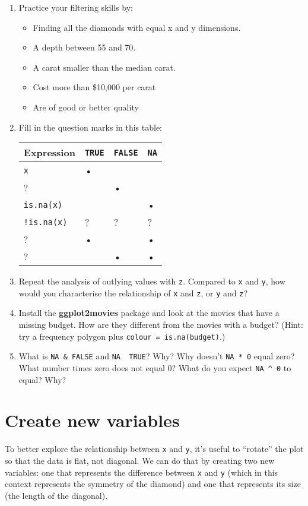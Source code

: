 \begin{enumerate}
\def\labelenumi{\arabic{enumi}.}
\item
  Practice your filtering skills by:

  \begin{itemize}
  \tightlist
  \item
    Finding all the diamonds with equal x and y dimensions.
  \item
    A depth between 55 and 70.
  \item
    A carat smaller than the median carat.
  \item
    Cost more than \$10,000 per carat
  \item
    Are of good or better quality
  \end{itemize}
\item
  Fill in the question marks in this table:

  \begin{longtable}[c]{@{}llll@{}}
  \toprule
  Expression & \texttt{TRUE} & \texttt{FALSE} &
  \texttt{NA}\tabularnewline
  \midrule
  \endhead
  \texttt{x} & • &\tabularnewline
  ? & & •\tabularnewline
  \texttt{is.na(x)} & & & •\tabularnewline
  \texttt{!is.na(x)} & ? & ? & ?\tabularnewline
  ? & • & & •\tabularnewline
  ? & & • & •\tabularnewline
  \bottomrule
  \end{longtable}
\item
  Repeat the analysis of outlying values with \texttt{z}. Compared to
  \texttt{x} and \texttt{y}, how would you characterise the relationship
  of \texttt{x} and \texttt{z}, or \texttt{y} and \texttt{z}?
\item
  Install the \textbf{ggplot2movies} package and look at the movies that
  have a missing budget. How are they different from the movies with a
  budget? (Hint: try a frequency polygon plus
  \texttt{colour\ =\ is.na(budget)}.)
\item
  What is \texttt{NA\ \&\ FALSE} and \texttt{NA\ \textbar{}\ TRUE}? Why?
  Why doesn't \texttt{NA\ *\ 0} equal zero? What number times zero does
  not equal 0? What do you expect \texttt{NA\ \^{}\ 0} to equal? Why?
\end{enumerate}

\section{Create new variables}\label{mutate}

To better explore the relationship between \texttt{x} and \texttt{y},
it's useful to ``rotate'' the plot so that the data is flat, not
diagonal. We can do that by creating two new variables: one that
represents the difference between \texttt{x} and \texttt{y} (which in
this context represents the symmetry of the diamond) and one that
represents its size (the length of the diagonal). 


